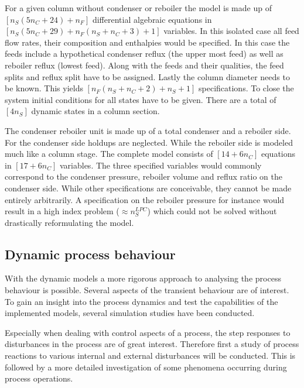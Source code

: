         For a given column without condenser or reboiler the model is made up of $[n_S (5n_C + 24) + n_F]$
        differential algebraic equations in $[n_S (5n_C + 29) + n_F (n_S + n_C + 3) + 1]$ variables. In this
        isolated case all feed flow rates, their composition and enthalpies would be specified. In this case
        the feeds include a hypothetical condenser reflux (the upper most feed) as well as reboiler reflux
        (lowest feed). Along with the feeds and their qualities, the feed splits and reflux split have to be
        assigned. Lastly the column diameter needs to be known. This yields $[n_F (n_S + n_C + 2) + n_S + 1]$
        specifications. To close the system initial conditions for all states have to be given. There
        are a total of $[4 n_S ]$ dynamic states in a column section.

        The condenser reboiler unit is made up of a total condenser and a reboiler side. For the condenser side
        holdups are neglected. While the reboiler side is modeled much like a column stage. The complete model
        consists of $[14 + 6 n_C]$ equations in $[17 + 6 n_C]$ variables. The three specified variables would
        commonly correspond to the condenser pressure, reboiler volume and reflux ratio on the condenser side.
        While other specifications are conceivable, they cannot be made entirely arbitrarily. A specification
        on the reboiler pressure for instance would result in a high index problem ($\approx n_S^{LPC}$) which
        could not be solved without drastically reformulating the model.

    \subsection{Dynamic process behaviour}
        With the dynamic models a more rigorous approach to analysing the process behaviour is possible.
        Several aspects of the transient behaviour are of interest. To gain an insight into the process dynamics
        and test the capabilities of the implemented models, several simulation studies have been conducted.

        Especially when dealing with control aspects of a process, the step responses to disturbances in the
        process are of great interest. Therefore first a study of process reactions to various internal and
        external disturbances will be conducted. This is followed by a more detailed investigation of some phenomena
        occurring during process operations.


